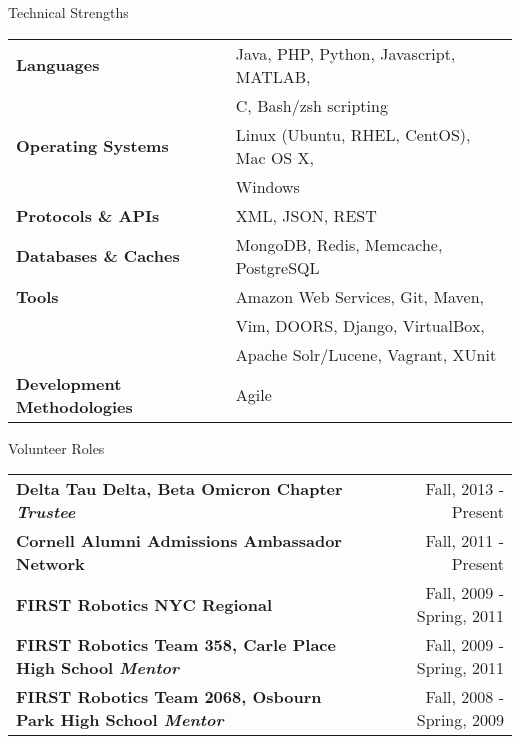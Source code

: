 \documentclass{resume} %
\begin{document}
\begin{rSection}{Technical Strengths}

\begin{tabular}{ @{} >{\bfseries}l @{\hspace{6ex}} l }
Languages & Java, PHP, Python, Javascript, MATLAB, \\
& C, Bash/zsh scripting \\
Operating Systems & Linux (Ubuntu, RHEL, CentOS), Mac OS X, \\
& Windows \\
Protocols \& APIs & XML, JSON, REST \\
Databases \& Caches & MongoDB, Redis, Memcache, PostgreSQL \\
Tools & Amazon Web Services, Git, Maven, \\ 
& Vim, DOORS, Django, VirtualBox, \\
& Apache Solr/Lucene, Vagrant, XUnit \\
Development Methodologies & Agile
\end{tabular}

\end{rSection}


\begin{rSection}{Volunteer Roles}
    \begin{tabular}{ @{} >{\bfseries}l @{\hspace{6ex}}r }
    Delta Tau Delta, Beta Omicron Chapter \textit{Trustee} & Fall, 2013 - Present \\
    Cornell Alumni Admissions Ambassador Network & Fall, 2011 - Present \\
    FIRST Robotics NYC Regional & Fall, 2009 - Spring, 2011 \\
    FIRST Robotics Team 358, Carle Place High School \textit{Mentor} & Fall, 2009 - Spring, 2011 \\
    FIRST Robotics Team 2068, Osbourn Park High School \textit{Mentor} & Fall, 2008 - Spring, 2009 \\
    \end{tabular}
\end{rSection}


\end{document}
